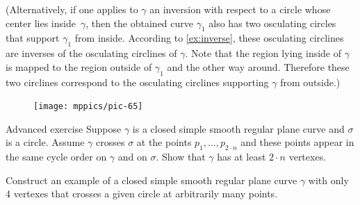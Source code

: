 (Alternatively, if one applies to $\gamma$ an inversion with respect to a circle whose center lies inside~$\gamma$, then the obtained curve $\gamma_1$ also has  two osculating circles that support $\gamma_1$ from inside.
According to \ref{ex:inverse}, these osculating circlines are inverses of the osculating circlines of $\gamma$.
Note that the region lying inside of $\gamma$ is mapped to the region outside of $\gamma_1$ and the other way around.
Therefore these two circlines correspond to the osculating circlines supporting $\gamma$ from outside.)
\qeds

\begin{figure}
\vskip-7mm
\centering
\texttt{[image: mppics/pic-65]}
\vskip0mm
\end{figure}

\begin{thm}{Advanced exercise}\label{ex:curve-crosses-circle}
Suppose $\gamma$ is a closed simple smooth regular plane curve and $\sigma$ is a circle.
Assume $\gamma$ crosses $\sigma$ at the points $p_1,\dots,p_{2{\cdot} n}$ and these points appear in the same cycle order on $\gamma$ and on $\sigma$.
Show that $\gamma$ has at least $2\cdot n$ vertexes.

Construct an example of a closed simple smooth regular plane curve $\gamma$ with only 4 vertexes that crosses a given circle at arbitrarily many points. 
\end{thm}


